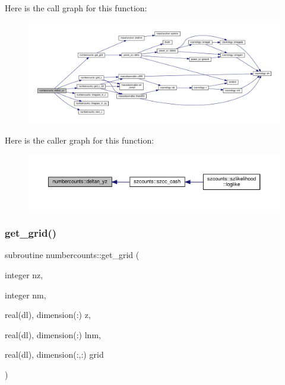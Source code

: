 Here is the call graph for this function\+:
\nopagebreak
\begin{figure}[H]
\begin{center}
\leavevmode
\includegraphics[width=350pt]{namespacenumbercounts_a7e87a46c1e125cb57eff635630c88506_cgraph}
\end{center}
\end{figure}
Here is the caller graph for this function\+:
\nopagebreak
\begin{figure}[H]
\begin{center}
\leavevmode
\includegraphics[width=350pt]{namespacenumbercounts_a7e87a46c1e125cb57eff635630c88506_icgraph}
\end{center}
\end{figure}
\mbox{\label{namespacenumbercounts_a530ce747969dd91d2b57a90d658dbb62}} 
\subsubsection{\texorpdfstring{get\+\_\+grid()}{get\_grid()}}
{\footnotesize\ttfamily subroutine numbercounts\+::get\+\_\+grid (\begin{DoxyParamCaption}\item[{integer}]{nz,  }\item[{integer}]{nm,  }\item[{real(dl), dimension(\+:)}]{z,  }\item[{real(dl), dimension(\+:)}]{lnm,  }\item[{real(dl), dimension(\+:,\+:)}]{grid }\end{DoxyParamCaption})}



